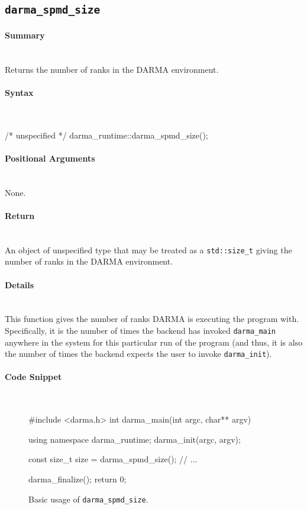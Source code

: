 \subsection{\texttt{darma\_spmd\_size}}


\paragraph{Summary}\mbox{}\\
Returns the number of ranks in the DARMA environment.

\paragraph{Syntax}\mbox{}\\
\begin{CppCode}
/* unspecified */ darma_runtime::darma_spmd_size();
\end{CppCode}

\paragraph{Positional Arguments} \mbox{}\\
None. 

\paragraph{Return} \mbox{}\\
An object of unspecified type that may be treated as a \texttt{std::size\_t}
giving the number of ranks in the DARMA environment.

\paragraph{Details} \mbox{}\\
This function gives the number of ranks DARMA is executing the program with. 
Specifically, it is the number of times the backend has invoked
\texttt{darma\_main} anywhere in the system for this particular run of the
program (and thus, it is also the number of times the backend expects the user
to invoke \texttt{darma\_init}).

\paragraph{Code Snippet} \mbox{}\\
\begin{figure}[!h]
\begin{CppCodeNumb}
#include <darma.h>
int darma_main(int argc, char** argv)
{
  using namespace darma_runtime;
  darma_init(argc, argv);

  const size_t size = darma_spmd_size();
  // ...

  darma_finalize();
  return 0;
}
\end{CppCodeNumb}
\label{fig:fe_api_ranksize}
\caption{Basic usage of \texttt{darma\_spmd\_size}.}
\end{figure}

